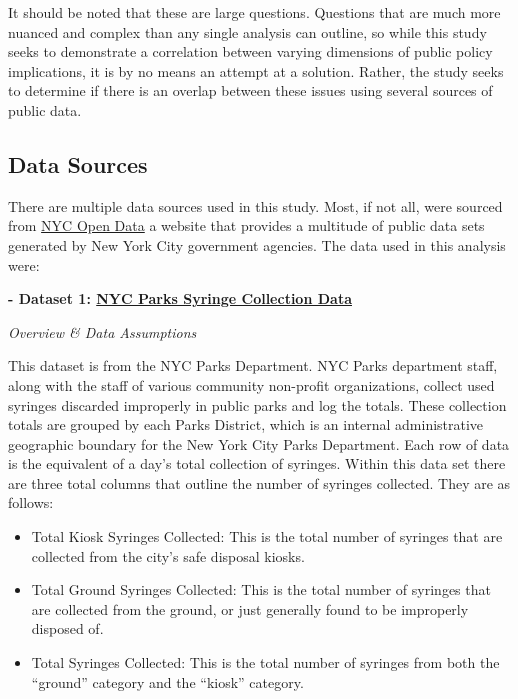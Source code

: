 \documentclass[
]{article}
\begin{document}
It should be noted that these are large questions. Questions that are
much more nuanced and complex than any single analysis can outline, so
while this study seeks to demonstrate a correlation between varying
dimensions of public policy implications, it is by no means an attempt
at a solution. Rather, the study seeks to determine if there is an
overlap between these issues using several sources of public data.

\subsection{Data Sources}\label{data-sources}

There are multiple data sources used in this study. Most, if not all,
were sourced from \href{https://opendata.cityofnewyork.us/}{NYC Open
Data} a website that provides a multitude of public data sets generated
by New York City government agencies. The data used in this analysis
were:

\textbf{- Dataset 1:
\href{https://data.cityofnewyork.us/Public-Safety/Summary-of-Syringe-Data-in-NYC-Parks/t8xi-d5wb/about_data}{NYC
Parks Syringe Collection Data}}

\emph{Overview \& Data Assumptions}

This dataset is from the NYC Parks Department. NYC Parks department
staff, along with the staff of various community non-profit
organizations, collect used syringes discarded improperly in public
parks and log the totals. These collection totals are grouped by each
Parks District, which is an internal administrative geographic boundary
for the New York City Parks Department. Each row of data is the
equivalent of a day's total collection of syringes. Within this data set
there are three total columns that outline the number of syringes
collected. They are as follows:

\begin{itemize}
\item
  Total Kiosk Syringes Collected: This is the total number of syringes
  that are collected from the city's safe disposal kiosks.
\item
  Total Ground Syringes Collected: This is the total number of syringes
  that are collected from the ground, or just generally found to be
  improperly disposed of.
\item
  Total Syringes Collected: This is the total number of syringes from
  both the ``ground'' category and the ``kiosk'' category.
\end{itemize}
\end{document}
